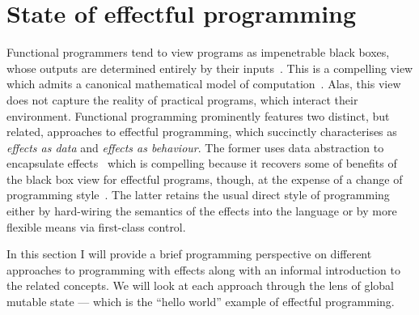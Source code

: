 \documentclass[12pt,phd,lfcs,twoside,openright,logo,leftchapter,normalheadings]{infthesis}
\theoremstyle{plain}
\theoremstyle{definition}
\begin{document}
\section{State of effectful programming}

Functional programmers tend to view programs as impenetrable black
boxes, whose outputs are determined entirely by their
inputs~\cite{Hughes89,Howard80}. This is a compelling view which
admits a canonical mathematical model of
computation~\cite{Church32,Church41}. Alas, this view does not capture
the reality of practical programs, which interact their environment.
%
Functional programming prominently features two distinct, but related,
approaches to effectful programming, which \citet{Filinski96}
succinctly characterises as \emph{effects as data} and \emph{effects
  as behaviour}.
%
The former uses data abstraction to encapsulate
effects~\cite{Moggi91,Wadler92} which is compelling because it
recovers some of benefits of the black box view for effectful
programs, though, at the expense of a change of programming
style~\cite{JonesW93}. The latter retains the usual direct style of
programming either by hard-wiring the semantics of the effects into
the language or by more flexible means via first-class control.

In this section I will provide a brief programming perspective on
different approaches to programming with effects along with an
informal introduction to the related concepts. We will look at each
approach through the lens of global mutable state --- which is the
``hello world'' example of effectful programming.


\end{document}
